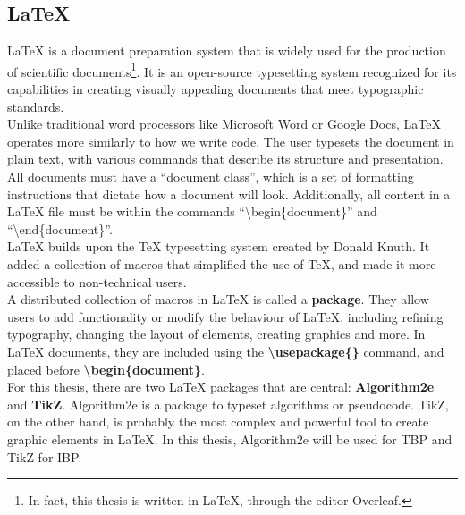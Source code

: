 
\subsection{LaTeX}

LaTeX is a document preparation system that is widely used for the production of scientific documents\footnote{In fact, this thesis is written in LaTeX, through the editor Overleaf.}. It is an open-source typesetting system recognized for its capabilities in creating visually appealing documents that meet typographic standards. \hfill \\

Unlike traditional word processors like Microsoft Word or Google Docs, LaTeX operates more similarly to how we write code. The user typesets the document in plain text, with various commands that describe its structure and presentation. All documents must have a ``document class'', which is a set of formatting instructions that dictate how a document will look. Additionally, all content in a LaTeX file must be within the commands ``\textbackslash begin\{document\}'' and ``\textbackslash end\{document\}''. \hfill \\

LaTeX builds upon the TeX typesetting system created by Donald Knuth. It added a collection of macros that simplified the use of TeX, and made it more accessible to non-technical users. \hfill \\

A distributed collection of macros in LaTeX is called a \textbf{package}. They allow users to add functionality or modify the behaviour of LaTeX, including refining typography, changing the layout of elements, creating graphics and more. In LaTeX documents, they are included using the \textbf{\textbackslash usepackage\{\}} command, and placed before \textbf{\textbackslash begin\{document\}}. \hfill \\

For this thesis, there are two LaTeX packages that are central: \textbf{Algorithm2e} and \textbf{TikZ}. Algorithm2e is a package to typeset algorithms or pseudocode. TikZ, on the other hand, is probably the most complex and powerful tool to create graphic elements in LaTeX. In this thesis, Algorithm2e will be used for TBP and TikZ for IBP. \hfill \\

